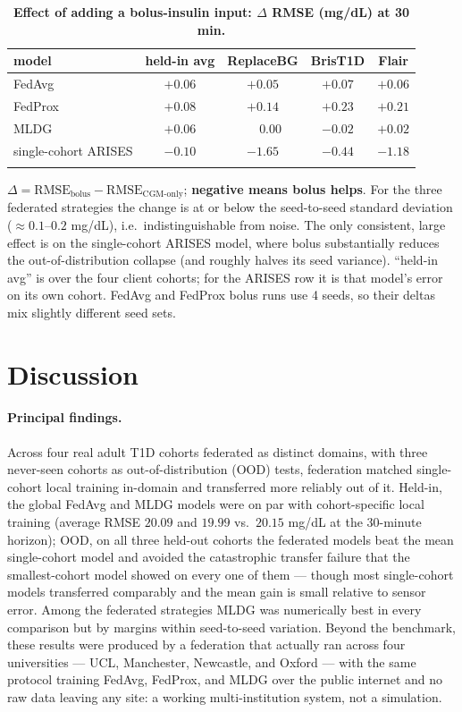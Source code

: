 \documentclass[10pt,letterpaper]{article}
\newlength\savedwidth
\newcommand\thickhline{\noalign{\global\savedwidth\arrayrulewidth\global\arrayrulewidth 2pt}%
\hline
\noalign{\global\arrayrulewidth\savedwidth}}
\begin{document}
\begin{table}[!ht]
\centering
\captionsetup{justification=centering,singlelinecheck=on}
\caption{\bf Effect of adding a bolus-insulin input: $\Delta$ RMSE (mg/dL) at 30 min.}
\label{tab:bolus}
\begin{tabular}{lcccc}
\thickhline
model & held-in avg & ReplaceBG & BrisT1D & Flair \\
\hline
FedAvg  & $+0.06$ & $+0.05$ & $+0.07$ & $+0.06$ \\
FedProx & $+0.08$ & $+0.14$ & $+0.23$ & $+0.21$ \\
MLDG    & $+0.06$ & $\phantom{+}0.00$ & $-0.02$ & $+0.02$ \\
\hline
single-cohort ARISES & $-0.10$ & $\mathbf{-1.65}$ & $\mathbf{-0.44}$ & $\mathbf{-1.18}$ \\
\thickhline
\end{tabular}
\begin{center}
{\small $\Delta = \text{RMSE}_{\text{bolus}} - \text{RMSE}_{\text{CGM-only}}$;
\textbf{negative means bolus helps}. For the three federated strategies the change
is at or below the seed-to-seed standard deviation ($\approx 0.1$--$0.2$ mg/dL),
i.e.\ indistinguishable from noise. The only consistent, large effect is on the
single-cohort ARISES model, where bolus substantially reduces the
out-of-distribution collapse (and roughly halves its seed variance). ``held-in
avg'' is over the four client cohorts; for the ARISES row it is that model's error
on its own cohort. FedAvg and FedProx bolus runs use 4 seeds, so their deltas mix
slightly different seed sets.}
\end{center}
\end{table}

\section*{Discussion}

\paragraph{Principal findings.} Across four real adult T1D cohorts federated as
distinct domains, with three never-seen cohorts as out-of-distribution (OOD)
tests, federation matched single-cohort local training in-domain and transferred
more reliably out of it. Held-in, the global FedAvg and MLDG models were on par
with cohort-specific local training (average RMSE $20.09$ and $19.99$ vs.\
$20.15$ mg/dL at the 30-minute horizon); OOD, on all three held-out cohorts the
federated models beat the mean single-cohort model and avoided the catastrophic
transfer failure that the smallest-cohort model showed on every one of them ---
though most single-cohort models transferred comparably and the mean gain is
small relative to sensor error. Among the federated strategies MLDG was
numerically best in every comparison but by margins within seed-to-seed
variation. Beyond the benchmark, these results were produced by a federation that
actually ran across four universities --- UCL, Manchester, Newcastle, and Oxford
--- with the same protocol training FedAvg, FedProx, and MLDG over the public
internet and no raw data leaving any site: a working multi-institution system,
not a simulation.
\end{document}
